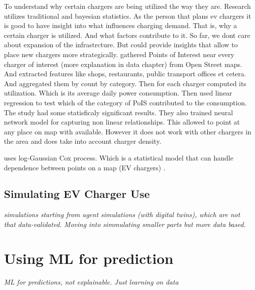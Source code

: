 
To understand why certain chargers are being utilized the way they are. Research utilizes traditional and bayesian statistics. As the person that plans ev chargers it is good to have insight into what influences charging demand. That is, why a certain charger is utilized. And what factors contribute to it. So far, we dont care about expansion of the infrastrcture. But could provide insights that allow to place new chargers more strategically.  gathered Points of Interest near every charger of interest (more explanation in data chapter) from Open Street maps. And extracted features like shops, restaurants, public transport offices et cetera. And aggregated them by count by category. Then for each charger computed its utilization. Which is its average daily power consumption. Then used linear regression to test which of the category of PoIS contributed to the consumption. The study had some statisficaly significant results. They also trained neural network model for capturing non linear relationships. This allowed to point at any place on map with available. However it does not work with other chargers in the area and does take into account charger density.

 uses log-Gaussian Cox process. Which is a statistical model that can handle dependence between points on a map (EV chargers)
.

\subsection{Simulating EV Charger Use}

\textit{simulations
    starting from agent simulations (with digital twins), which are not that data-validated. Moving into simmulating smaller parts but more data based.
}


\section{Using ML for prediction}

\textit{ML for predictions, not explainable. Just learning on data}

